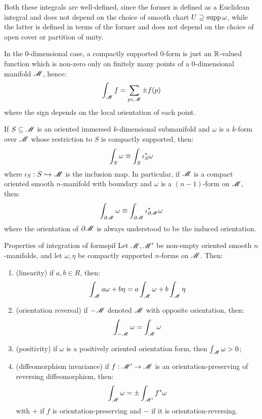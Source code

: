 Both these integrals are well-defined, since the former is defined as a Euclidean integral and does not depend on the choice of smooth chart $ U \supseteq \operatorname{supp} \omega $, while the latter is defined in terms of the former and does not depend on the choice of open cover or partition of unity.

In the $ 0 $-dimensional case, a compactly supported $ 0 $-form is just an $ \mathbb{R} $-valued function which is non-zero only on finitely many points of a $ 0 $-dimensional manifold $ \mathscr{M} $, hence:
\begin{equation*}
  \int_\mathscr{M} f = \sum_{p \in \mathscr{M}} \pm f(p)
\end{equation*}
where the sign depends on the local orientation of each point.

If $ S \subseteq \mathscr{M} $ is an oriented immersed $ k $-dimensional submanifold and $ \omega $ is a $ k $-form over $ \mathscr{M} $ whose restriction to $ S $ is compactly supported, then:
\begin{equation*}
  \int_S \omega \equiv \int_S \iota_S^* \omega
\end{equation*}
where $ \iota_S : S \hookrightarrow \mathscr{M} $ is the inclusion map. In particular, if $ \mathscr{M} $ is a compact oriented smooth $ n $-manifold with boundary and $ \omega $ is a $ (n-1) $-form on $ \mathscr{M} $, then:
\begin{equation*}
  \int_{\partial \mathscr{M}} \omega \equiv \int_{\partial \mathscr{M}} \iota_{\partial \mathscr{M}}^* \omega
\end{equation*}
where the orientation of $ \partial \mathscr{M} $ is always understood to be the induced orientation.

\begin{lemma}{Properties of integration of forms}{pif}
  Let $ \mathscr{M} , \mathscr{M}' $ be non-empty oriented smooth $ n $-manifolds, and let $ \omega , \eta $ be compactly supported $ n $-forms on $ \mathscr{M} $. Then:
  \begin{enumerate}
    \item \label{item:pif-1} (linearity) if $ a,b \in R $, then:
      \begin{equation*}
        \int_\mathscr{M} a \omega + b \eta = a \int_\mathscr{M} \omega + b \int_\mathscr{M} \eta
      \end{equation*}
    \item \label{item:pif-2} (orientation reversal) if $ -\mathscr{M} $ denoted $ \mathscr{M} $ with opposite orientation, then:
      \begin{equation*}
        \int_{-\mathscr{M}} \omega = \int_\mathscr{M} \omega
      \end{equation*}
    \item \label{item:pif-3} (positivity) if $ \omega $ is a positively oriented orientation form, then $ \int_\mathscr{M} \omega > 0 $;
    \item \label{item:pif-4} (diffeomorphism invariance) if $ f : \mathscr{M}' \rightarrow \mathscr{M} $ is an orientation-preserving of reversing diffeomorphism, then:
      \begin{equation*}
        \int_\mathscr{M} \omega = \pm \int_{\mathscr{M}'} f^* \omega
      \end{equation*}
      with $ + $ if $ f $ is orientation-preserving and $ - $ if it is orientation-reversing.
  \end{enumerate}
\end{lemma}

